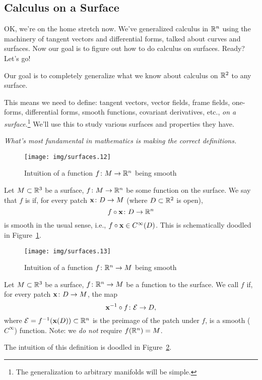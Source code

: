 \subsection{Calculus on a Surface}

OK, we're on the home stretch now. We've generalized calculus in
$\mathbb{R}^{n}$ using the machinery of tangent vectors and differential forms,
talked about curves and surfaces. Now our goal is to figure out how to
do calculus on surfaces. Ready? Let's go!

\M
Our goal is to completely generalize what we know about calculus on
$\mathbb{R}^{2}$ to any surface.

This means we need to define: tangent vectors, vector fields, frame
fields, one-forms, differential forms, smooth functions, covariant
derivatives, etc., \emph{on a surface}.\footnote{The generalization to arbitrary
manifolds will be simple.} We'll use this to study various surfaces and
properties they have.

\emph{What's most fundamental in mathematics is making the correct definitions.}

\begin{figure}[h]
\centering
  \texttt{[image: img/surfaces.12]}
\caption{Intuition of a function $f\colon M\to\mathbb{R}^{n}$ being smooth}\label{fig:surfaces:smooth-function-from-surface}
\end{figure}

\begin{definition}\label{defn:surfaces:smooth-function-from-surface}
Let $M\subset\mathbb{R}^{3}$ be a surface, $f\colon M\to\mathbb{R}^{n}$ be some
function on the surface.
We say that $f$ is  if, for every patch $\mathbf{x}\colon D\to M$
(where $D\subset\mathbb{R}^{2}$ is open),
\begin{equation}
f\circ\mathbf{x}\colon D\to\mathbb{R}^{n}
\end{equation}
is smooth in the usual sense, i.e., $f\circ\mathbf{x}\in C^{\infty}(D)$.
This is schematically doodled in Figure~\ref{fig:surfaces:smooth-function-from-surface}.
\end{definition}

\begin{figure}[h]
\centering
  \texttt{[image: img/surfaces.13]}
\caption{Intuition of a function $f\colon \mathbb{R}^{n}\to M$ being smooth}\label{fig:surfaces:smooth-function-to-surface}
\end{figure}

\begin{definition}\label{defn:surfaces:smooth-function-to-surface}
Let $M\subset\mathbb{R}^{3}$ be a surface, $f\colon\mathbb{R}^{n}\to M$ be a function
to the surface. We call $f$  if, for every patch
$\mathbf{x}\colon D\to M$, the map
\begin{equation}
\mathbf{x}^{-1}\circ f\colon\mathcal{E}\to D,
\end{equation}
where $\mathcal{E}=f^{-1}(\mathbf{x}(D))\subset\mathbb{R}^{n}$ is the preimage
of the patch under $f$, is a smooth ($C^{\infty}$) function. Note: we \emph{do
not} require $f(\mathbb{R}^{n})=M$.

The intuition of this definition is doodled in Figure~\ref{fig:surfaces:smooth-function-to-surface}.
\end{definition}


